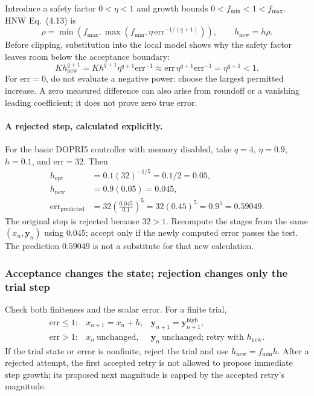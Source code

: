 Introduce a safety factor $0<\eta<1$ and growth bounds
$0<f_{\min}<1<f_{\max}$. HNW Eq.~(4.13) is
\begin{equation}\label{Eq:AdaptBoundedStep}
 \rho=\min\!\left(f_{\max},
          \max\!\left(f_{\min},\eta\,\mathrm{err}^{-1/(q+1)}\right)\right),
 \qquad h_{\mathrm{new}}=h\rho.
\end{equation}
Before clipping, substitution into the local model shows why the safety factor
leaves room below the acceptance boundary:
\[
 K h_{\mathrm{new}}^{q+1}
 =K h^{q+1}\eta^{q+1}\mathrm{err}^{-1}
 \approx\mathrm{err}\,\eta^{q+1}\mathrm{err}^{-1}
 =\eta^{q+1}<1.
\]
For $\mathrm{err}=0$, do not evaluate a negative power: choose the largest
permitted increase. A zero measured difference can also arise from roundoff
or a vanishing leading coefficient; it does not prove zero true error.

\paragraph{A rejected step, calculated explicitly.}
For the basic DOPRI5 controller with memory disabled, take
$q=4$, $\eta=0.9$, $h=0.1$, and $\mathrm{err}=32$. Then
\[
\begin{aligned}
 h_{\mathrm{opt}}&=0.1(32)^{-1/5}=0.1/2=0.05,\\
 h_{\mathrm{new}}&=0.9(0.05)=0.045,\\
 \mathrm{err}_{\mathrm{predicted}}
 &=32\left(\frac{0.045}{0.1}\right)^5
   =32(0.45)^5=0.9^5=0.59049.
\end{aligned}
\]
The original step is rejected because $32>1$. Recompute the stages from the
same $(x_n,\mathbf y_n)$ using $0.045$; accept only if the newly computed
error passes the test. The prediction $0.59049$ is not a substitute for that
new calculation.

\subsubsection{Acceptance changes the state; rejection changes only the trial step}
Check both finiteness and the scalar error. For a finite trial,
\begin{equation}\label{Eq:AdaptAcceptReject}
\begin{array}{lll}
 \mathrm{err}\leq1:
 &x_{n+1}=x_n+h,
 &\mathbf y_{n+1}=\mathbf y_{n+1}^{\mathrm{high}},\\[2pt]
 \mathrm{err}>1:
 &x_n\ \text{unchanged},
 &\mathbf y_n\ \text{unchanged; retry with }h_{\mathrm{new}}.
\end{array}
\end{equation}
If the trial state or error is nonfinite, reject the trial and use $h_{\mathrm{new}}=f_{\min}h$. After a rejected attempt, the first accepted
retry is not allowed to propose immediate step growth; its proposed next
magnitude is capped by the accepted retry's magnitude.

